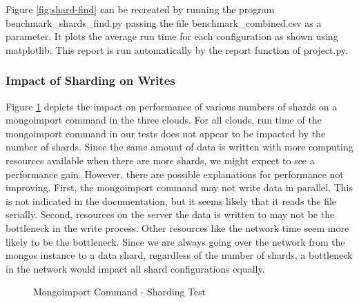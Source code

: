 \documentclass[9pt,twocolumn,twoside]{../../styles/osajnl}
\begin{document}
Figure \ref{fig:shard-find} can be recreated by running the program
benchmark\_shards\_find.py passing the file benchmark\_combined.csv as
a parameter. It plots the average run time for each configuration as
shown using matplotlib. This report is run automatically by the report
function of project.py.




\subsubsection{Impact of Sharding on Writes}




Figure \ref{fig:shard-import} depicts the impact on performance of
various numbers of shards on a mongoimport command in the three
clouds. For all clouds, run time of the mongoimport command in our
tests does not appear to be impacted by the number of shards. Since
the same amount of data is written with more computing resources
available when there are more shards, we might expect to see a
performance gain. However, there are possible explanations for
performance not improving. First, the mongoimport command may not
write data in parallel. This is not indicated in the documentation,
but it seems likely that it reads the file serially. Second, resources
on the server the data is written to may not be the bottleneck in the
write process. Other resources like the network time seem more likely
to be the bottleneck. Since we are always going over the network from
the mongos instance to a data shard, regardless of the number of
shards, a bottleneck in the network would impact all shard
configurations equally.

\begin{figure}[htbp]
\centering
{}
\caption{Mongoimport Command - Sharding Test}
\label{fig:shard-import}
\end{figure}
\end{document}
